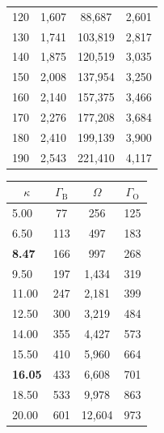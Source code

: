 \documentclass[a4paper,11pt]{article}
\begin{document}
\begin{appendix}
\begin{table}[ht]
{\begin{tabular}{l|ccc}
    120                                  & 1,607        & 88,687     & 2,601         \\
    130                                  & 1,741        & 103,819    & 2,817         \\
    140                                  & 1,875        & 120,519    & 3,035         \\
    150                                  & 2,008        & 137,954    & 3,250         \\
    160                                  & 2,140        & 157,375    & 3,466         \\
    170                                  & 2,276        & 177,208    & 3,684         \\
    180                                  & 2,410        & 199,139    & 3,900         \\
    190                                  & 2,543        & 221,410    & 4,117       
  \end{tabular}
  \hspace{1.0cm}
  \begin{tabular}{l|ccc}
    \multicolumn{1}{c|}{\(\kappa\)} & \(\Gamma_{\text{B}}\) & \(\Omega\) & \(\Gamma_{\text{O}}\) \\ \hline
    5.00                            & 77           & 256        & 125          \\
    6.50                            & 113          & 497        & 183          \\
    \textbf{8.47}                   & 166          & 997        &  268         \\
    9.50                            & 197          & 1,434      & 319          \\
    11.00                           & 247          & 2,181      & 399          \\
    12.50                           & 300          & 3,219      & 484          \\
    14.00                           & 355          & 4,427      & 573          \\
    15.50                           & 410          & 5,960      & 664          \\
    \textbf{16.05}                  & 433          & 6,608      & 701          \\
    18.50                           & 533          & 9,978      & 863          \\
    20.00                           & 601          & 12,604     & 973          \\

\end{tabular}}
\end{table}
\end{appendix}
\end{document}
